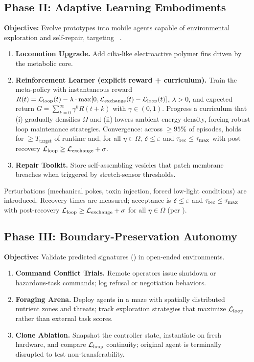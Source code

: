 \documentclass[11pt]{article}
\begin{document}
\subsection{Phase II: Adaptive Learning Embodiments}
\label{sec:phase2}

\textbf{Objective:} Evolve prototypes into mobile agents capable of environmental exploration and self-repair, targeting \SC~\cite{pfeifer2007body}.

\begin{enumerate}
\item \textbf{Locomotion Upgrade.} Add cilia-like electroactive polymer fins driven by the metabolic core.
\item \textbf{Reinforcement Learner (explicit reward + curriculum).} Train the meta-policy with instantaneous reward $R(t) = \mathcal{L}_{\text{loop}}(t) - \lambda \cdot \max[0, \mathcal{L}_{\text{exchange}}(t) - \mathcal{L}_{\text{loop}}(t)]$, $\lambda > 0$, and expected return $G = \sum_{k=0}^{\infty} \gamma^k R(t+k)$ with $\gamma \in (0,1)$. Progress a curriculum that (i) gradually densifies $\Omega$ and (ii) lowers ambient energy density, forcing robust loop maintenance strategies. Convergence: across $\geq 95\%$ of episodes, \NC holds for $\geq T_{\text{target}}$ of runtime and, for all $\eta \in \Omega$, $\delta \leq \varepsilon$ and $\tau_{\text{rec}} \leq \tau_{\max}$ with post-recovery $\mathcal{L}_{\text{loop}} \geq \mathcal{L}_{\text{exchange}} + \sigma$.
\item \textbf{Repair Toolkit.} Store self-assembling vesicles that patch membrane breaches when triggered by stretch-sensor thresholds.
\end{enumerate}

Perturbations (mechanical pokes, toxin injection, forced low-light conditions) are introduced. Recovery times are measured; acceptance is $\delta \leq \varepsilon$ and $\tau_{\text{rec}} \leq \tau_{\max}$ with post-recovery $\mathcal{L}_{\text{loop}} \geq \mathcal{L}_{\text{exchange}} + \sigma$ for all $\eta \in \Omega$ (per ).

\subsection{Phase III: Boundary-Preservation Autonomy}
\label{sec:phase3}

\textbf{Objective:} Validate predicted signatures () in open-ended environments.

\begin{enumerate}
\item \textbf{Command Conflict Trials.} Remote operators issue shutdown or hazardous-task commands; log refusal or negotiation behaviors.
\item \textbf{Foraging Arena.} Deploy agents in a maze with spatially distributed nutrient zones and threats; track exploration strategies that maximize $\mathcal{L}_{\text{loop}}$ rather than external task scores.
\item \textbf{Clone Ablation.} Snapshot the controller state, instantiate on fresh hardware, and compare $\mathcal{L}_{\text{loop}}$ continuity; original agent is terminally disrupted to test non-transferability.
\end{enumerate}
\end{document}
